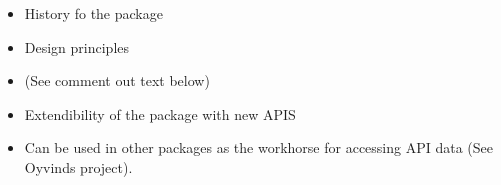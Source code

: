 \documentclass[article]{jss}
\begin{document}
\begin{itemize}
    \item History fo the package
    \item Design principles
    \item (See comment out text below)
    \item Extendibility of the package with new APIS
    \item Can be used in other packages as the workhorse for accessing API data (See Oyvinds project).
\end{itemize}




\end{document}
